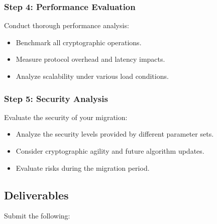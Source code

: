 \documentclass[10pt,a4paper,american]{exam}
\begin{document}
\subsubsection*{Step 4: Performance Evaluation}
Conduct thorough performance analysis:
\begin{itemize}
	\item Benchmark all cryptographic operations.
	\item Measure protocol overhead and latency impacts.
	\item Analyze scalability under various load conditions.
\end{itemize}

\subsubsection*{Step 5: Security Analysis}
Evaluate the security of your migration:
\begin{itemize}
	\item Analyze the security levels provided by different parameter sets.
	\item Consider cryptographic agility and future algorithm updates.
	\item Evaluate risks during the migration period.
\end{itemize}

\subsection*{Deliverables}
Submit the following:
\end{document}
